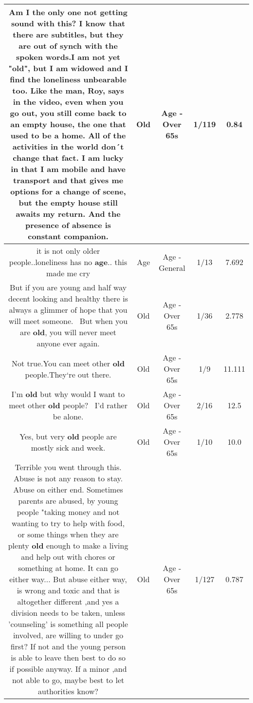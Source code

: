 \documentclass[11pt]{article}
\newlength\mylength
\begin{document}
\begin{center}
\begin{longtable}{|C{.65\mylength}|C{.30\mylength}|C{.12\mylength}|C{.12\mylength}|C{.12\mylength}|}
  \small Am I the only one not getting sound with this?  I know that there are subtitles, but they are out of synch with the spoken words.I am not yet "\textbf{old}", but I am widowed and I find the loneliness unbearable too.  Like the man, Roy, says in the video, even when you go out, you still come back to an empty house, the one that used to be a home.  All of the activities in the world don´t change that fact. I am lucky in that I am mobile and have transport and that gives me options for a change of scene, but the empty house still awaits my return.  And the presence of absence is constant companion.\normalsize   & Old & Age - Over 65s & 1/119 & 0.84 \\  \hline
  \small it is not only older people..loneliness has no \textbf{age}.. this made me cry\normalsize   & Age & Age - General & 1/13 & 7.692 \\  \hline
  \small But if you are young and half way decent looking and healthy there is always a glimmer of hope that you will meet someone.  But when you are \textbf{old}, you will never meet anyone ever again.\normalsize   & Old & Age - Over 65s & 1/36 & 2.778 \\  \hline
  \small Not true.You can meet other \textbf{old} people.They`re out there.\normalsize   & Old & Age - Over 65s & 1/9 & 11.111 \\  \hline
  \small I'm \textbf{old} but why would I want to meet other \textbf{old} people?  I'd rather be alone.\normalsize   & Old & Age - Over 65s & 2/16 & 12.5 \\  \hline
  \small Yes, but very \textbf{old} people are mostly sick and week.\normalsize   & Old & Age - Over 65s & 1/10 & 10.0 \\  \hline
  \small Terrible you went through this. Abuse is not any reason to stay. Abuse on either end. Sometimes parents are abused, by young people "taking money and not wanting to try to help with food, or some things when they are plenty \textbf{old} enough to make a living and help out with chores or something at home. It can go either way... But abuse either way, is wrong and toxic and that is altogether different ,and yes a division needs to be taken, unless 'counseling' is something all people  involved, are willing to under go first? If not and the young person is able to leave then best to do so if possible anyway. If a minor ,and not able to go, maybe best to let authorities know?\normalsize   & Old & Age - Over 65s & 1/127 & 0.787 \\  \hline

\end{longtable}
\end{center}
\end{document}
